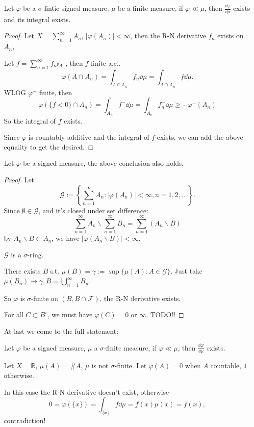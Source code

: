 \begin{proposition}
	Let $\varphi$ be a $\sigma$-fintie signed measure,  $\mu$ be a finite measure,
	if $\varphi\ll \mu$, then $\frac{\dd\varphi}{\dd\mu}$ exists and
	its integral exists.
\end{proposition}
\begin{proof}[Proof]
    Let $X = \sum_{n=1}^{\infty} A_n$, $|\varphi(A_n)| <\infty$,
	then the R-N derivative $f_n$ exists on $A_n$,

	Let $f = \sum_{n=1}^{\infty} f_n\ii_{A_n}$, then $f$ finite a.e.,
	\[
	\varphi(A\cap A_n) = \int_{A\cap A_n}f_n \dd\mu = \int_{A\cap A_n}f\dd \mu.
	\]
	WLOG $\varphi^-$ finite, then
	\[
	\varphi(\{f<0\}\cap A_n) = \int_{A_n}f^-\dd\mu = \int_{A_n}f_n^-\dd\mu
	\ge -\varphi^-(A_n)
	\]
	So the integral of $f$ exists.

	Since $\varphi$ is countably additive and the integral of $f$ exists,
	we can add the above equality to get the desired.
\end{proof}

\begin{proposition}
	Let $\varphi$ be a signed measure, the above conclusion also holds.
\end{proposition}
\begin{proof}[Proof]
    Let
	\[
	\mathscr{G}:=\left\{\sum_{n=1}^{\infty} A_n :
	|\varphi(A_n)|< \infty, n=1,2,\dots\right\}.
	\]
	Since $\emptyset\in \mathscr{G}$, and it's closed under set difference:
	\[
	\sum_{n=1}^{\infty} A_n \backslash \sum_{n=1}^{\infty} B_n
	= \sum_{n=1}^{\infty} (A_n \backslash B)
	\]
	by $A_n \backslash B \subset A_n$,
	we have $|\varphi(A_n \backslash B)| < \infty$.

	$\mathscr{G}$ is a $\sigma$-ring.

	There exists  $B$ s.t. $\mu(B) = \gamma:= \sup\{\mu(A): A\in \mathscr{G}\}$.
	Just take $\mu(B_n) \to \gamma, B = \bigcup_{n=1}^\infty B_n$.

	So $\varphi$ is $\sigma$-finite on  $(B, B\cap \mathscr{F})$,
	the R-N derivative exists.

	For all $C \subset B^c$, we must have $\varphi(C) = 0$ or $ \infty$.
	TODO!!
\end{proof}

At last we come to the full statement:
\begin{theorem}
    Let $\varphi$ be a signed measure, $\mu$ a $\sigma$-finite measure,
	if  $\varphi\ll\mu$, then $\frac{\dd \varphi}{\dd \mu}$ exists.
\end{theorem}
\begin{example}
    Let $X = \mathbb{R}$, $\mu(A) = \#A$, $\mu$ is not $\sigma$-finite.
	Let  $\varphi(A) = 0$ when $A$ countable, $1$ otherwise.

	In this case the R-N derivative doesn't exist, otherwise
	\[
	0 = \varphi(\{x\}) = \int_{\{x\}} f\dd \mu = f(x)\mu(x) = f(x),
	\]
	contradiction!
\end{example}

